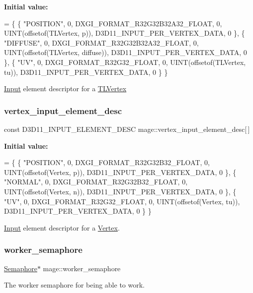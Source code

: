 {\bfseries Initial value\+:}
\begin{DoxyCode}
= \{
        \{ \textcolor{stringliteral}{"POSITION"}, 0, DXGI\_FORMAT\_R32G32B32A32\_FLOAT, 0, UINT(offsetof(TLVertex, p)), 
      D3D11\_INPUT\_PER\_VERTEX\_DATA, 0 \},
        \{ \textcolor{stringliteral}{"DIFFUSE"}, 0, DXGI\_FORMAT\_R32G32B32A32\_FLOAT, 0, UINT(offsetof(TLVertex, diffuse)), 
      D3D11\_INPUT\_PER\_VERTEX\_DATA, 0 \},
        \{ \textcolor{stringliteral}{"UV"}, 0, DXGI\_FORMAT\_R32G32\_FLOAT, 0, UINT(offsetof(TLVertex, tu)), D3D11\_INPUT\_PER\_VERTEX\_DATA, 
      0 \}
    \}
\end{DoxyCode}
\hyperlink{classmage_1_1_input}{Input} element descriptor for a \hyperlink{structmage_1_1_t_l_vertex}{T\+L\+Vertex} \hypertarget{namespacemage_a8647e0bbbbe87e5c6d7a4d4622230119}{}\label{namespacemage_a8647e0bbbbe87e5c6d7a4d4622230119} 
\subsubsection{\texorpdfstring{vertex\+\_\+input\+\_\+element\+\_\+desc}{vertex\_input\_element\_desc}}
{\footnotesize\ttfamily const D3\+D11\+\_\+\+I\+N\+P\+U\+T\+\_\+\+E\+L\+E\+M\+E\+N\+T\+\_\+\+D\+E\+SC mage\+::vertex\+\_\+input\+\_\+element\+\_\+desc\mbox{[}$\,$\mbox{]}}

{\bfseries Initial value\+:}
\begin{DoxyCode}
= \{
        \{ \textcolor{stringliteral}{"POSITION"}, 0, DXGI\_FORMAT\_R32G32B32\_FLOAT, 0, UINT(offsetof(Vertex, p)), 
      D3D11\_INPUT\_PER\_VERTEX\_DATA, 0 \},
        \{ \textcolor{stringliteral}{"NORMAL"}, 0, DXGI\_FORMAT\_R32G32B32\_FLOAT, 0, UINT(offsetof(Vertex, n)), 
      D3D11\_INPUT\_PER\_VERTEX\_DATA, 0 \},
        \{ \textcolor{stringliteral}{"UV"}, 0, DXGI\_FORMAT\_R32G32\_FLOAT, 0, UINT(offsetof(Vertex, tu)), D3D11\_INPUT\_PER\_VERTEX\_DATA, 0 
      \}
    \}
\end{DoxyCode}
\hyperlink{classmage_1_1_input}{Input} element descriptor for a \hyperlink{structmage_1_1_vertex}{Vertex}. \hypertarget{namespacemage_a17c3448f9fba7521d188d30bdfb77e33}{}\label{namespacemage_a17c3448f9fba7521d188d30bdfb77e33} 
\subsubsection{\texorpdfstring{worker\+\_\+semaphore}{worker\_semaphore}}
{\footnotesize\ttfamily \hyperlink{classmage_1_1_semaphore}{Semaphore}$\ast$ mage\+::worker\+\_\+semaphore\hspace{0.3cm}{\ttfamily [static]}}

The worker semaphore for being able to work. 
